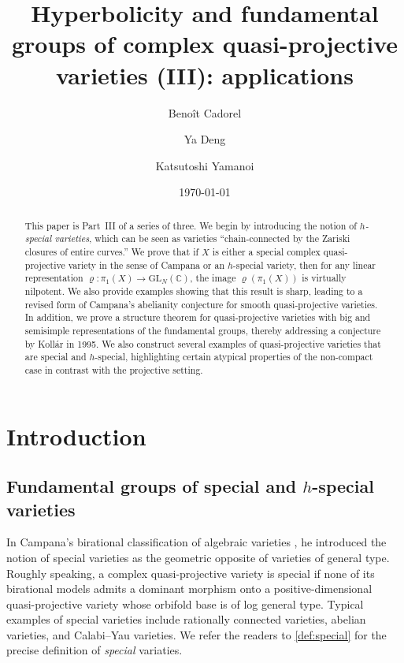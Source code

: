 \documentclass[11pt,english]{smfart}
\title[Fundamental groups of special varieties]{Hyperbolicity and fundamental groups of complex quasi-projective varieties (III): applications}
\date{\today}
\author[B. Cadorel]{Beno\^{i}t Cadorel}
\author[Y. Deng]{Ya Deng}
\author[K. Yamanoi]{Katsutoshi Yamanoi}
\theoremstyle{plain}
\theoremstyle{definition}
\theoremstyle{remark}
\numberwithin{equation}{subsection}
\theoremstyle{plain}
\begin{document}
 



	\begin{abstract} 
This paper is Part~III of a series of three. We begin by introducing the notion of \emph{$h$-special varieties}, which can be seen as varieties “chain-connected by the Zariski closures of entire curves.” We prove that if $X$ is either a special complex quasi-projective variety in the sense of Campana or an $h$-special variety, then for any linear representation $\varrho:\pi_1(X)\to \mathrm{GL}_N(\mathbb{C})$, the image $\varrho(\pi_1(X))$ is virtually nilpotent. We also provide examples showing that this result is sharp, leading to a revised form of Campana’s abelianity conjecture for smooth quasi-projective varieties. In addition, we prove a structure theorem for quasi-projective varieties  with big and semisimple representations of the fundamental groups, thereby addressing a conjecture   by Kollár in 1995. We also construct several examples of quasi-projective varieties that are special and $h$-special, highlighting certain atypical properties of the non-compact case in contrast with the projective setting.
	\end{abstract}  
 


 

\maketitle
  \tableofcontents	

 
	 \section{Introduction} 
 \subsection{Fundamental groups of  special and $h$-special varieties}
In  Campana's birational classification of algebraic varieties \cite{Cam04,Cam11}, he introduced the notion of special varieties as the geometric opposite of varieties of  general type. Roughly speaking, a complex quasi-projective variety is special if none of its birational models admits a dominant morphism onto a positive-dimensional quasi-projective variety whose orbifold base is of  log general type.
 Typical examples of special varieties include rationally connected varieties, abelian varieties, and Calabi–Yau varieties.   We refer the readers to \cref{def:special} for the precise definition of \emph{special}   variaties. %
\end{document}
